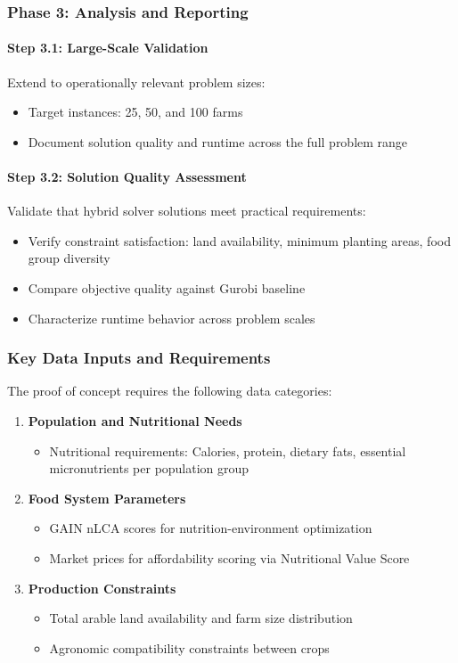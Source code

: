 \documentclass{oqireport}
\begin{document}
\subsubsection{Phase 3: Analysis and Reporting}

\paragraph{Step 3.1: Large-Scale Validation}
Extend to operationally relevant problem sizes:
\begin{itemize}
    \item Target instances: 25, 50, and 100 farms
    \item Document solution quality and runtime across the full problem range
\end{itemize}

\paragraph{Step 3.2: Solution Quality Assessment}
Validate that hybrid solver solutions meet practical requirements:
\begin{itemize}
    \item Verify constraint satisfaction: land availability, minimum planting areas, food group diversity
    \item Compare objective quality against Gurobi baseline
    \item Characterize runtime behavior across problem scales
\end{itemize}

\subsubsection{Key Data Inputs and Requirements}

The proof of concept requires the following data categories:

\begin{enumerate}
\item \textbf{Population and Nutritional Needs}
\begin{itemize}
    \item Nutritional requirements: Calories, protein, dietary fats, essential micronutrients per population group
\end{itemize}

\item \textbf{Food System Parameters}
\begin{itemize}
    \item GAIN nLCA scores for nutrition-environment optimization
    \item Market prices for affordability scoring via Nutritional Value Score
\end{itemize}

\item \textbf{Production Constraints}
\begin{itemize}
    \item Total arable land availability and farm size distribution
    \item Agronomic compatibility constraints between crops
\end{itemize}
\end{enumerate}
\end{document}
